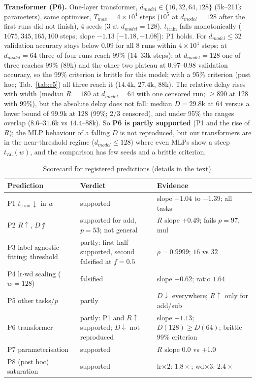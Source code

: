 \documentclass{article}
\newcommand{\ttr}{t_{\mathrm{train}}}
\newcommand{\tva}{t_{\mathrm{val}}}
\begin{document}
\textbf{Transformer (P6).} One-layer transformer, $d_{model}\in\{16,32,64,128\}$ (5k--211k parameters), same optimiser, $T_{max}=4\times10^4$ steps ($10^5$ at $d_{model}{=}128$ after the first runs did not finish), 4 seeds (3 at $d_{model}{=}128$).
$\ttr$ falls monotonically ($1075,345,165,100$ steps; slope $-1.13$ [$-1.18,-1.08$]): P1 holds. For $d_{model}\le32$ validation accuracy stays below $0.09$ for all 8 runs within $4\times10^4$ steps; at $d_{model}{=}64$ three of four runs reach 99\% ($14$--$33$k steps);
at $d_{model}{=}128$ one of three reaches 99\% ($89$k) and the other two plateau at $0.97$--$0.98$ validation accuracy, so the 99\% criterion is brittle for this model; with a 95\% criterion (post hoc; Tab.~\ref{tab:e5}) all three reach it ($14.4$k, $27.4$k, $88$k).
The relative delay rises with width (median $R=180$ at $d_{model}{=}64$ with one censored run; $\ge890$ at 128 with 99\%), but the absolute delay does not fall: median $D=29.8$k at $64$ versus a lower bound of $99.9$k at 128 (99\%; 2/3 censored), and under 95\% the ranges overlap ($8.6$--$31.6$k vs $14.4$--$88$k).
So \textbf{P6 is partly supported} (P1 and the rise of $R$); the MLP behaviour of a falling $D$ is not reproduced, but our transformers are in the near-threshold regime ($d_{model}\le128$) where even MLPs show a steep $\tva(w)$, and the comparison has few seeds and a brittle criterion.

\begin{table}[t]\centering\small
\caption{Scorecard for registered predictions (details in the text).}\label{tab:score}
\begin{tabular}{p{3.5cm}p{4.6cm}p{4.8cm}}\toprule
Prediction & Verdict & Evidence \\\midrule
P1 $\ttr\downarrow$ in $w$ & supported & slope $-1.04$ to $-1.39$; all tasks \\
P2 $R\uparrow$, $D\not\uparrow$ & supported for add, $p{=}53$; not general & $R$ slope $+0.49$; fails $p{=}97$, mul \\
P3 label-agnostic fitting; threshold & partly: first half supported, second falsified at $f{=}0.5$ & $\rho{=}0.9999$; $16$ vs $32$ \\
P4 lr$\cdot$wd scaling ($w{=}128$) & falsified & slope $-0.62$; ratio $1.64$ \\
P5 other tasks/$p$ & partly & $D\downarrow$ everywhere; $R\uparrow$ only for add/sub \\
P6 transformer & partly: P1 and $R\uparrow$ supported; $D\downarrow$ not reproduced & slope $-1.13$; $D(128)\ge D(64)$; brittle 99\% criterion \\
P7 parameterisation & supported & $R$ slope $0.0$ vs $+1.0$ \\
P8 (post hoc) saturation & supported & lr$\times2$: $1.8\times$; wd$\times3$: $2.4\times$ \\\bottomrule
\end{tabular}
\end{table}
\end{document}
